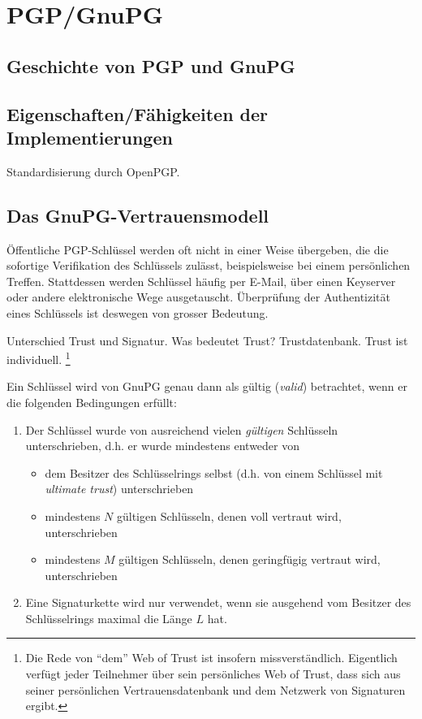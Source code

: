 \section{PGP/GnuPG}
\label{ch:Grundlagen:sec:PGP}

\subsection{Geschichte von PGP und GnuPG}
\label{ch:Grundlagen:sec:PGP:subsec:Geschichte}

\subsection{Eigenschaften/Fähigkeiten der Implementierungen}
\label{ch:Grundlagen:sec:PGP:subsec:Eigenschaften}

Standardisierung durch OpenPGP.

\subsection{Das GnuPG-Vertrauensmodell}
\label{sec:das-gnupg-vertrauensmodell}

Öffentliche PGP-Schlüssel werden oft nicht in einer Weise übergeben,
die die sofortige Verifikation des Schlüssels zulässt, beispielsweise
bei einem persönlichen Treffen. Stattdessen werden Schlüssel häufig
per E-Mail, über einen Keyserver oder andere elektronische Wege
ausgetauscht.  Überprüfung der Authentizität eines Schlüssels ist
deswegen von grosser Bedeutung.

Unterschied Trust und Signatur. Was bedeutet Trust?
Trustdatenbank. Trust ist individuell. \footnote{Die Rede von ``dem''
  Web of Trust ist insofern missverst\"andlich. Eigentlich verf\"ugt
  jeder Teilnehmer \"uber sein pers\"onliches Web of Trust, dass sich
  aus seiner pers\"onlichen Vertrauensdatenbank und dem Netzwerk von
  Signaturen ergibt.}

Ein Schlüssel wird von GnuPG genau dann als gültig (\emph{valid})
betrachtet, wenn er die folgenden Bedingungen erfüllt:

\begin{enumerate}
\item Der Schlüssel wurde von ausreichend vielen \emph{gültigen} Schlüsseln
  unterschrieben, d.h. er wurde mindestens entweder von
  \begin{itemize}
  \item dem Besitzer des Schlüsselrings selbst (d.h. von einem
    Schlüssel mit \emph{ultimate trust}) unterschrieben
  \item mindestens $N$ gültigen Schlüsseln, denen voll vertraut wird, unterschrieben
  \item mindestens $M$ gültigen Schlüsseln, denen geringfügig
    vertraut wird, unterschrieben
  \end{itemize}
\item Eine Signaturkette wird nur verwendet, wenn sie ausgehend vom
  Besitzer des Schlüsselrings maximal die Länge $L$ hat.
\end{enumerate}


